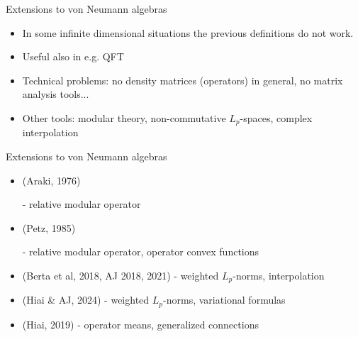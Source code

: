 \documentclass[mathserif]{beamer}
\newcommand{\<}{\langle}
\renewcommand{\>}{\rangle}
\begin{document}
\begin{frame}{Extensions to von Neumann algebras}


\begin{itemize}

\item In some infinite dimensional situations the previous definitions do not work.

\vskip 3mm

\item Useful also in e.g. QFT

\vskip 3mm
\item Technical problems: no density matrices (operators) in general, no matrix analysis
tools...

\vskip 3mm

\item Other tools: modular theory, non-commutative $L_p$-spaces, complex interpolation

\end{itemize}


\end{frame}


\begin{frame}{Extensions to von Neumann algebras}





\begin{itemize}

\item {} {\small (Araki, 1976)}

\vskip 2mm
\hskip 3cm - relative modular operator
\vskip 2mm

\item {} {\small (Petz, 1985)}

\vskip 2mm
\hskip 1cm - relative modular operator, operator convex functions
\vskip 2mm

\item {} {\small (Berta et al, 2018, AJ 2018, 2021)}
\vskip 2mm
\hskip 3cm - weighted $L_p$-norms, interpolation
\vskip 2mm

\item {} {\small (Hiai \& AJ, 2024)}
\vskip 2mm
\hskip 3cm - weighted $L_p$-norms, variational formulas
\vskip 2mm
\vskip 3mm

\item {} {\small (Hiai, 2019)}
\vskip 2mm
\hskip 3cm - operator means, generalized connections
\vskip 2mm





\end{itemize}




\end{frame}
\end{document}
